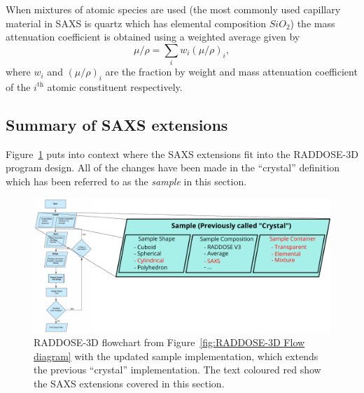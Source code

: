 When mixtures of atomic species are used (the most commonly used capillary material in SAXS is quartz which has elemental composition $SiO_2$) the mass attenuation coefficient is obtained using a weighted average given by
\begin{equation}
    \mu/\rho = \sum_i w_i (\mu/\rho)_i,
\end{equation}
where $w_i$ and $(\mu/\rho)_i$ are the fraction by weight and mass attenuation coefficient of the $i^{\text{th}}$ atomic constituent respectively.

\subsection{Summary of SAXS extensions}
\label{sub:Summary of SAXS extensions}
Figure~\ref{fig:Updated RADDOSE-3D Flow diagram} puts into context where the SAXS extensions fit into the RADDOSE-3D program design.
All of the changes have been made in the ``crystal'' definition which has been referred to as the \textit{sample} in this section.
\begin{figure}
    \centering
    \includegraphics[width=1\textwidth]{figures/saxs/Sample_definitions.pdf}
    \caption{RADDOSE-3D flowchart from Figure~\ref{fig:RADDOSE-3D Flow diagram} with the updated sample implementation, which extends the previous ``crystal'' implementation.
    The text coloured red show the SAXS extensions covered in this section.}
    \label{fig:Updated RADDOSE-3D Flow diagram}
\end{figure}

